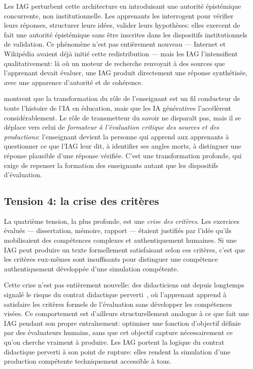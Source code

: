 Les IAG perturbent cette architecture en introduisant une autorité épistémique concurrente, non institutionnelle. 
Les apprenants les interrogent pour vérifier leurs réponses, structurer leurs idées, valider leurs hypothèses: elles exercent de fait une autorité épistémique sans être inscrites dans les dispositifs institutionnels de validation. 
Ce phénomène n'est pas entièrement nouveau --- Internet et Wikipédia avaient déjà initié cette redistribution --- mais les IAG l'intensifient qualitativement: là où un moteur de recherche renvoyait à des sources que l'apprenant devait évaluer, une IAG produit directement une réponse synthétisée, avec une apparence d'autorité et de cohérence.

\cite{lepage2023recension} montrent que la transformation du rôle de l'enseignant est un fil conducteur de toute l'histoire de l'IA en éducation, mais que les IA génératives l'accélèrent considérablement. %
Le rôle de transmetteur du savoir ne disparaît pas, mais il se déplace vers celui de \emph{formateur à l'évaluation critique des sources et des productions}: l'enseignant devient la personne qui apprend aux apprenants à questionner ce que l'IAG leur dit, à identifier ses angles morts, à distinguer une réponse plausible d'une réponse vérifiée. 
C'est une transformation profonde, qui exige de repenser la formation des enseignants autant que les dispositifs d'évaluation.

\subsection*{Tension 4: la crise des critères}

La quatrième tension, la plus profonde, est une \emph{crise des critères}. 
Les exercices évalués --- dissertation, mémoire, rapport --- étaient justifiés par l'idée qu'ils mobilisaient des compétences complexes et authentiquement humaines. 
Si une IAG peut produire un texte formellement satisfaisant selon ces critères, c'est que les critères eux-mêmes sont insuffisants pour distinguer une compétence authentiquement développée d'une simulation compétente.

Cette crise n'est pas entièrement nouvelle: des didacticiens ont depuis longtemps signalé le risque du \og{}contrat didactique perverti\fg{}~\citep{leroux2015evaluer}, où l'apprenant apprend à satisfaire les critères formels de l'évaluation sans développer les compétences visées.
Ce comportement est d'ailleurs structurellement analogue à ce que fait une IAG pendant son propre entraînement: optimiser une fonction d'objectif définie par des évaluateurs humains, sans que cet objectif capture nécessairement ce qu'on cherche vraiment à produire. 
Les IAG portent la logique du contrat didactique perverti à son point de rupture: elles rendent la simulation d'une production compétente techniquement accessible à tous.

